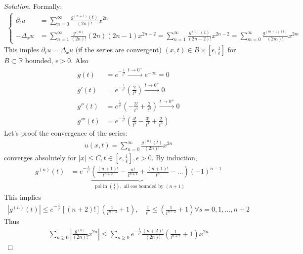 \documentclass{report}
\theoremstyle{tommy}
\begin{document}
  \begin{proof}[Solution]
    Formally:
    \begin{align*}
      \left\{
        \begin{aligned}
          \partial_t u &= \sum_{n=0}^\infty \frac{g^{(n+1)}(t)}{(2n)!} x^{2n} \\
          -\Delta_x u &= \sum_{n=1}^\infty \frac{g^{(n)}}{(2n)!} (2n)(2n-1)x^{2n-2}
          = \sum_{n=1}^\infty \frac{g^{(n)}(t)}{(2n-2)!} x^{2n-2}
          = \sum_{m=0}^\infty \frac{g^{(m+1)(t)}}{(2m)!} x^{2m}
        \end{aligned}
      \right.
    \end{align*}
    This imples \(\partial_t u = \Delta_x u\) (if the series are convergent) \((x,t) \in B \times \left[\epsilon, \frac{1}{\epsilon}\right]\) for \(B \subset \mathbb{R}\) bounded, \(\epsilon > 0\). Also
    \begin{align*}
      g(t) &= e^{- \frac{1}{t^2}} \xrightarrow{t \to 0^+} e^{-\infty} = 0 \\
      g'(t) &= e^{- \frac{1}{t^2}} \left(\frac{2}{t^3}\right) \xrightarrow{t \to 0^+} 0 \\
      g''(t) &= e^{\frac{1}{t^2}} \left(- \frac{3!}{t^4} + \frac{2}{t^3}\right) \xrightarrow{t \to 0^+} 0 \\
      g'''(t) &= e^{- \frac{1}{t^2}} \left(\frac{4!}{t^5} - \frac{3!}{t^4} + \frac{2}{t^3}\right)
    \end{align*}
    Let's proof the convergence of the series:
    \begin{align*}
      u(x,t) = \sum_{n=0}^\infty \frac{g^{(n)}(t)}{(2n)!} x^{2n}
    \end{align*}
    converges absolutely for \(|x| \le C, t \in \left[\epsilon, \frac{1}{\epsilon}\right], \epsilon > 0\). By induction,
    \begin{align*}
      g^{(n)}(t) &= e^{-\frac{1}{t^2}} \underbrace{\left(\frac{(n+1)!}{t^{n+2}} - \frac{n!}{t^{n+1}} + \frac{(n+1)!}{t^n} - \dots\right)}_{\text{pol in } (\frac{1}{t}), \text{ all cos bounded by }(n+1)}(-1)^{n-1}
    \end{align*}
    This implies
    \begin{align*}
      |g^{(n)}(t)| \le e^{-\frac{1}{t^2}}[(n+2)!] \left(\frac{1}{t^{n+2}} + 1\right), \quad \frac{1}{t^s} \le \left(\frac{1}{t^{n+2}} + 1\right) \forall s =0,1,\dots, n+2
    \end{align*}
    Thus 
    \begin{align*}
      \sum_{n \ge 0} \left| \frac{g^{(n)}}{(2n)!}x^{2n}\right| \le \sum_{n \ge 0} e^{- \frac{1}{t^2}} \frac{(n+2)!}{(2n)!} \left(\frac{1}{t^{n+2}}+1\right)x^{2n}

\end{align*}
\end{proof}
\end{document}
